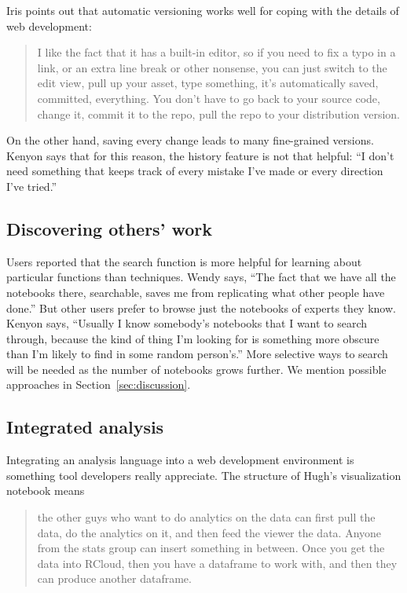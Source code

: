 Iris points out that automatic versioning works well for coping with
the details of web development:
\begin{quote}
I like the fact that it has a built-in editor, so
if you need to fix a typo in a link, or an extra line break or other
nonsense, you can just switch to the edit view, pull up your asset, type
something, it's automatically saved, committed, everything. You don't have to go
back to your source code, change it, commit it to the repo, pull the repo to
your distribution version.
\end{quote}

On the other hand, saving every change leads to many fine-grained
versions. Kenyon says that for this reason, the history feature is not that
helpful: ``I don't need something that keeps track of every mistake I've made or
every direction I've tried.''

\subsection{Discovering others' work}
Users reported that the search function is more helpful for learning about
particular functions than techniques. Wendy says, ``The fact that we have
all the notebooks there, searchable, saves me from replicating what other people
have done.''
But other users prefer to browse just the notebooks of experts they
know. Kenyon says, ``Usually I know somebody's notebooks that I want to search
through, because  the kind of thing I'm looking for is something
more obscure than I'm likely to find in some random person's.''
More selective ways to search will be needed as the number of notebooks
grows further. We mention possible approaches in Section~\ref{sec:discussion}.

\subsection{Integrated analysis}
Integrating an analysis language into a web development environment is something
tool developers really appreciate. The structure of Hugh's visualization
notebook means
\begin{quote}
the other guys who want to do analytics on the data can first pull
the data, do the analytics on it, and then feed the viewer the data.
Anyone from the stats group can insert something in between.
Once you get the data into RCloud, then you have a dataframe
to work with, and then they can produce another dataframe.
\end{quote}

